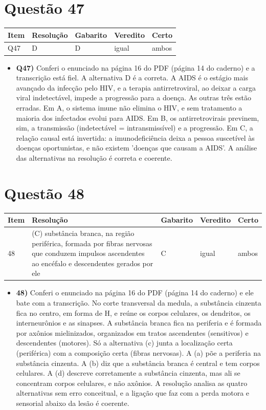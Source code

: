 \documentclass{article}%
\begin{document}
\section*{Questão 47}%
\begin{longtable}{@{}p{} p{} p{} p{} p{}@{}}\toprule Item & Resolução & Gabarito & Veredito & Certo \\ \midrule
Q47 & D & D & igual & ambos \\
\bottomrule\end{longtable}%
\begin{itemize}%
\item%
\textbf{Q47)} Conferi o enunciado na página 16 do PDF (página 14 do caderno) e a transcrição está fiel. A alternativa D é a correta. A AIDS é o estágio mais avançado da infecção pelo HIV, e a terapia antirretroviral, ao deixar a carga viral indetectável, impede a progressão para a doença. As outras três estão erradas. Em A, o sistema imune não elimina o HIV, e sem tratamento a maioria dos infectados evolui para AIDS. Em B, os antirretrovirais previnem, sim, a transmissão (indetectável = intransmissível) e a progressão. Em C, a relação causal está invertida: a imunodeficiência deixa a pessoa suscetível às doenças oportunistas, e não existem 'doenças que causam a AIDS'. A análise das alternativas na resolução é correta e coerente.%
\end{itemize}%
\section*{Questão 48}%
\begin{longtable}{@{}p{} p{} p{} p{} p{}@{}}\toprule Item & Resolução & Gabarito & Veredito & Certo \\ \midrule
48 & (C) substância branca, na região periférica, formada por fibras nervosas que conduzem impulsos ascendentes ao encéfalo e descendentes gerados por ele & C & igual & ambos \\
\bottomrule\end{longtable}%
\begin{itemize}%
\item%
\textbf{48)} Conferi o enunciado na página 16 do PDF (página 14 do caderno) e ele bate com a transcrição. No corte transversal da medula, a substância cinzenta fica no centro, em forma de H, e reúne os corpos celulares, os dendritos, os interneurônios e as sinapses. A substância branca fica na periferia e é formada por axônios mielinizados, organizados em tratos ascendentes (sensitivos) e descendentes (motores). Só a alternativa (c) junta a localização certa (periférica) com a composição certa (fibras nervosas). A (a) põe a periferia na substância cinzenta. A (b) diz que a substância branca é central e tem corpos celulares. A (d) descreve corretamente a substância cinzenta, mas ali se concentram corpos celulares, e não axônios. A resolução analisa as quatro alternativas sem erro conceitual, e a ligação que faz com a perda motora e sensorial abaixo da lesão é coerente.%
\end{itemize}%
\end{document}
